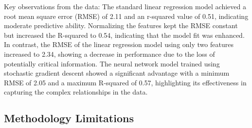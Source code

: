 \documentclass[conference]{IEEEtran}
\begin{document}
Key observations from the data:
The standard linear regression model achieved a root mean square error (RMSE) of 2.11 and an r-squared value of 0.51, indicating moderate predictive ability. Normalizing the features kept the RMSE constant but increased the R-squared to 0.54, indicating that the model fit was enhanced. In contrast, the RMSE of the linear regression model using only two features increased to 2.34, showing a decrease in performance due to the loss of potentially critical information. The neural network model trained using stochastic gradient descent showed a significant advantage with a minimum RMSE of 2.05 and a maximum R-squared of 0.57, highlighting its effectiveness in capturing the complex relationships in the data.

\subsection{Methodology Limitations}
\end{document}
